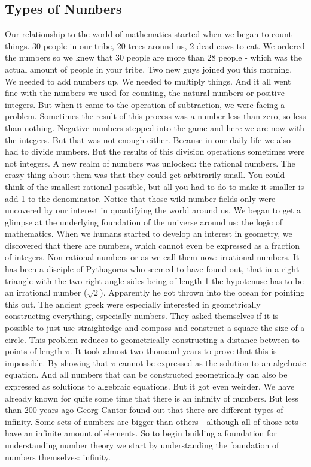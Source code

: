 \documentclass{article}
\theoremstyle{definition}
\begin{document}
\subsection{Types of Numbers}
Our relationship to the world of mathematics started when we began to count things. 30 people in our tribe, 20 trees around us, 2 dead cows to eat. We ordered the numbers so we knew that 30 people are more than 28 people - which was the actual amount of people in your tribe. Two new guys joined you this morning. We needed to add numbers up. We needed to multiply things. And it all went fine with the numbers we used for counting, the natural numbers or positive integers. But when it came to the operation of subtraction, we were facing a problem. Sometimes the result of this process was a number less than zero, so less than nothing. Negative numbers stepped into the game and here we are now with the integers. But that was not enough either. Because in our daily life we also had to divide numbers. But the results of this division operations sometimes were not integers. A new realm of numbers was unlocked: the rational numbers. The crazy thing about them was that they could get arbitrarily small. You could think of the smallest rational possible, but all you had to do to make it smaller is add 1 to the denominator. Notice that those wild number fields only were uncovered by our interest in quantifying the world around us. We began to get a glimpse at the underlying foundation of the universe around us: the logic of mathematics.
When we humans started to develop an interest in geometry, we discovered that there are numbers, which cannot even be expressed as a fraction of integers. Non-rational numbers or as we call them now: irrational numbers. It has been a disciple of Pythagoras who seemed to have found out, that in a right triangle with the two right angle sides being of length 1 the hypotenuse has to be an irrational number ($\sqrt{2}$). Apparently he got thrown into the ocean for pointing this out. The ancient greek were especially interested in geometrically constructing everything, especially numbers. They asked themselves if it is possible to just use straightedge and compass and construct a square the size of a circle. This problem reduces to geometrically constructing a distance between to points of length $\pi$. It took almost two thousand years to prove that this is impossible. By showing that $\pi$ cannot be expressed as the solution to an algebraic equation. And all numbers that can be constructed geometrically can also be expressed as solutions to algebraic equations. But it got even weirder. We have already known for quite some time that there is an infinity of numbers. But less than 200 years ago Georg Cantor found out that there are different types of infinity. Some sets of numbers are bigger than others - although all of those sets have an infinite amount of elements. So to begin building a foundation for understanding number theory we start by understanding the foundation of numbers themselves: infinity.
\end{document}

